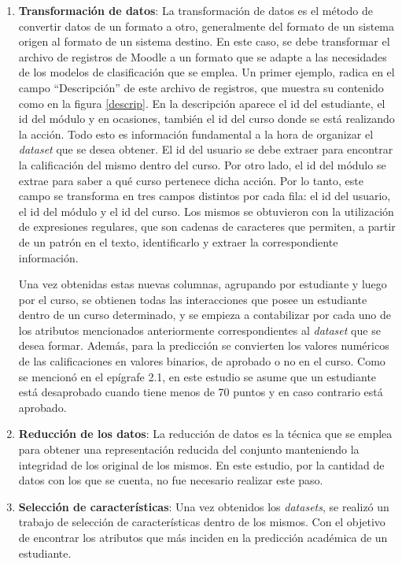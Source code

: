 \begin{enumerate}
    \item \textbf{Transformación de datos}: La transformación de datos es el método de convertir datos de un formato a otro, generalmente del formato de un sistema origen al formato de un sistema destino. En este caso, se debe transformar el archivo de registros de Moodle a un formato que se adapte a las necesidades de los modelos de clasificación que se emplea. Un primer ejemplo, radica en el campo ``Descripción'' de este archivo de registros, que muestra su contenido como en la figura \ref{descrip}.  
    En la descripción aparece el id del estudiante, el id del módulo y en ocasiones, también el id del curso donde se está realizando la acción. Todo esto es información fundamental a la hora de organizar el \textit{dataset} que se desea obtener. El id del usuario se debe extraer para encontrar la calificación del mismo dentro del curso. Por otro lado, el id del módulo se extrae para saber a qué curso pertenece dicha acción. Por lo tanto, este campo se transforma en tres campos distintos por cada fila: el id del usuario, el id del módulo y el id del curso. Los mismos se obtuvieron con la utilización de expresiones regulares, que son cadenas de caracteres que permiten, a partir de un patrón en el texto, identificarlo y extraer la correspondiente información. 

    Una vez obtenidas estas nuevas columnas, agrupando por estudiante y luego por el curso, se obtienen todas las interacciones que posee un estudiante dentro de un curso determinado, y se empieza a contabilizar por cada uno de los atributos mencionados anteriormente correspondientes al \textit{dataset} que se desea formar. Además, para la predicción se convierten los valores numéricos de las calificaciones en valores binarios, de aprobado o no en el curso. Como se mencionó en el epígrafe 2.1, en este estudio se asume que un estudiante está desaprobado cuando tiene menos de 70 puntos y en caso contrario está aprobado.

    \item \textbf{Reducción de los datos}: La reducción de datos es la técnica que se emplea para obtener una representación reducida del conjunto manteniendo la integridad de los original de los mismos. En este estudio, por la cantidad de datos con los que se cuenta, no fue necesario realizar este paso.
    \item \textbf{Selección de características}: Una vez obtenidos los \textit{datasets}, se realizó un trabajo de selección de características dentro de los mismos. Con el objetivo de encontrar los atributos que más inciden en la predicción académica de un estudiante. 


\end{enumerate}
